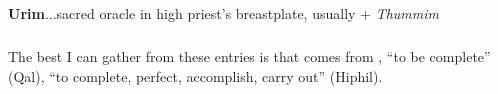 \begin{compactdesc}
\begin{compactitem}
\begin{compactitem}
								\end{compactitem}
						\end{compactitem}
					\item[DCH PDF 165] \textbf{} %
						\begin{compactitem}
							\item \textbf{Urim}...sacred oracle in high priest's breastplate, usually +  \textit{Thummim}
						\end{compactitem}
				\end{compactdesc}
				
				
					
			\subparagraph{\texorpdfstring{}{}} %
				\label{TUMMIM} %
				
				The best I can gather from these entries is that  comes from , ``to be complete'' (Qal), ``to complete, perfect, accomplish, carry out'' (Hiphil).
			
